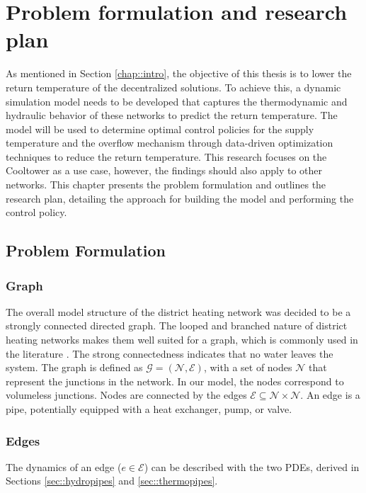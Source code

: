 \chapter{Problem formulation and research plan}\label{chap::PoA}
As mentioned in Section \ref{chap::intro}, the objective of this thesis is to lower the return temperature of the decentralized solutions. To achieve this, a dynamic simulation model needs to be developed that captures the thermodynamic and hydraulic behavior of these networks to predict the return temperature. The model will be used to determine optimal control policies for the supply temperature and the overflow mechanism through data-driven optimization techniques to reduce the return temperature. This research focuses on the Cooltower as a use case, however, the findings should also apply to other networks. This chapter presents the problem formulation and outlines the research plan, detailing the approach for building the model and performing the control policy. 

\section{Problem Formulation} 
\subsection{Graph}
The overall model structure of the district heating network was decided to be a strongly connected directed graph. The looped and branched nature of district heating networks makes them well suited for a graph, which is commonly used in the literature \cite{sibeijn2025economic, Krug2020,OPPELT2016336,Simonssongraph}. The strong connectedness indicates that no water leaves the system. The graph is defined as $\mathcal{G}=(\mathcal{N}, \mathcal{E})$, with a set of nodes $\mathcal{N}$ that represent the junctions in the network. In our model, the nodes correspond to volumeless junctions. Nodes are connected by the edges $\mathcal{E} \subseteq \mathcal{N} \times \mathcal{N}$. An edge is a pipe, potentially equipped with a heat exchanger, pump, or valve. 

\subsection{Edges}
The dynamics of an edge ($e \in \mathcal{E}$) can be described with the two PDEs, derived in Sections \ref{sec::hydropipes} and \ref{sec::thermopipes}.

